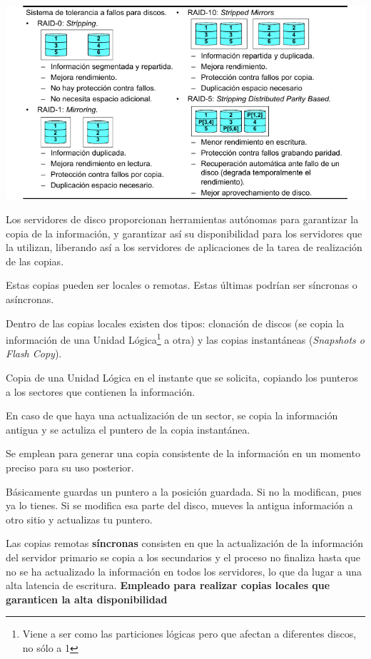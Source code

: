 \begin{center}
\includegraphics[width=\linewidth]{img/raid.png}
\end{center}

Los servidores de disco proporcionan herramientas autónomas para garantizar la copia de la información, y garantizar así su disponibilidad para los servidores que la utilizan, liberando así a los servidores de aplicaciones de la tarea de realización de las copias.

Estas copias pueden ser locales o remotas. Estas últimas podrían ser síncronas o asíncronas.

Dentro de las copias locales existen dos tipos: clonación de discos (se copia la información de una Unidad Lógica\footnote{Viene a ser como las particiones lógicas pero que afectan a diferentes discos, no sólo a 1} a otra) y las copias instantáneas (\textit{Snapshots o Flash Copy}).

\begin{defn}
Copia de una Unidad Lógica en el instante que se solicita, copiando los punteros a los sectores que contienen la información.

En caso de que haya una actualización de un sector, se copia la información antigua y se actuliza el puntero de la copia instantánea.

Se emplean para generar una copia consistente de la información en un momento preciso para su uso posterior.

\obs Básicamente guardas un puntero a la posición guardada. Si no la modifican, pues ya lo tienes. Si se modifica esa parte del disco, mueves la antigua información a otro sitio y actualizas tu puntero.
\end{defn}

Las copias remotas \textbf{síncronas} consisten en que la actualización de la información del servidor primario se copia a los secundarios y el proceso no finaliza hasta que no se ha actualizado la información en todos los servidores, lo que da lugar a una alta latencia de escritura. \textbf{Empleado para realizar copias locales que garanticen la alta disponibilidad}

